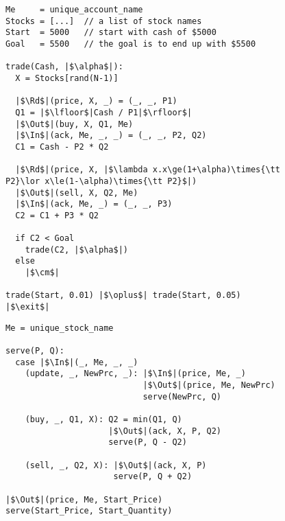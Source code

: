 \begin{figure}[tb]
\begin{lstlisting}[label=lst:trader,caption={Trader's Agent. Numbers are irrelevant and just for illustration purposes.}]
Me     = unique_account_name
Stocks = [...]  // a list of stock names
Start  = 5000   // start with cash of $5000
Goal   = 5500   // the goal is to end up with $5500

trade(Cash, |$\alpha$|):
  X = Stocks[rand(N-1)]

  |$\Rd$|(price, X, _) = (_, _, P1)
  Q1 = |$\lfloor$|Cash / P1|$\rfloor$|
  |$\Out$|(buy, X, Q1, Me)
  |$\In$|(ack, Me, _, _) = (_, _, P2, Q2)
  C1 = Cash - P2 * Q2

  |$\Rd$|(price, X, |$\lambda x.x\ge(1+\alpha)\times{\tt P2}\lor x\le(1-\alpha)\times{\tt P2}$|)
  |$\Out$|(sell, X, Q2, Me)
  |$\In$|(ack, Me, _) = (_, _, P3)
  C2 = C1 + P3 * Q2

  if C2 < Goal
    trade(C2, |$\alpha$|)
  else
    |$\cm$|

trade(Start, 0.01) |$\oplus$| trade(Start, 0.05)
|$\exit$|
\end{lstlisting}
\begin{lstlisting}[label=lst:stock,caption=Stock-serving Agent. \texttt{P} is the current price of the stock while \texttt{Q} is the quantity of stocks available for sale.]
Me = unique_stock_name

serve(P, Q):
  case |$\In$|(_, Me, _, _)
    (update, _, NewPrc, _): |$\In$|(price, Me, _)
                            |$\Out$|(price, Me, NewPrc)
                            serve(NewPrc, Q)

    (buy, _, Q1, X): Q2 = min(Q1, Q)
                     |$\Out$|(ack, X, P, Q2)
                     serve(P, Q - Q2)
    
    (sell, _, Q2, X): |$\Out$|(ack, X, P)
                      serve(P, Q + Q2)

|$\Out$|(price, Me, Start_Price)
serve(Start_Price, Start_Quantity)
\end{lstlisting}
\vspace*{-6mm}
\end{figure}
